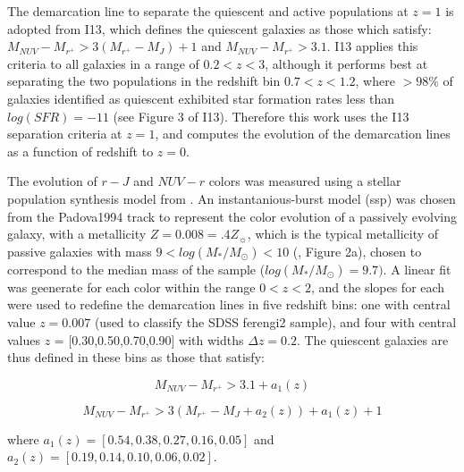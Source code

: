 \documentclass[useAMS,usenatbib]{mn2e}
\begin{document}
The demarcation line to separate the quiescent and active populations at $z=1$ is adopted from I13, which defines the quiescent galaxies as those which satisfy: $M_{NUV}-M_{r^{+}} > 3(M_{r^{+}}-M_{J})+1$ and $M_{NUV}-M_{r^{+}} > 3.1$. I13 applies this criteria to all galaxies in a range of $0.2<z<3$, although it performs best at separating the two populations in the redshift bin $0.7<z<1.2$, where $>98\%$ of galaxies identified as quiescent exhibited star formation rates less than $log(SFR) = -11$ (see Figure 3 of I13). Therefore this work uses the I13 separation criteria at $z=1$, and computes the evolution of the demarcation lines as a function of redshift to $z=0$. 

The evolution of $r-J$ and $NUV-r$ colors was measured using a stellar population synthesis model from \citet{Bruzual2003}. An instantanious-burst model (ssp) was chosen from the Padova1994 track to represent the color evolution of a passively evolving galaxy, with a metallicity $Z=0.008=.4Z_{\sun}$, which is the typical metallicity of passive galaxies with mass $9 < log(M_{*}/M_{\odot}) < 10$ (\citet{Peng2015}, Figure 2a), chosen to correspond to the median mass of the sample ($log(M_{*}/M_{\odot})=9.7)$. A linear fit was geenerate for each color within the range $0<z<2$, and the slopes for each were used to redefine the demarcation lines in five redshift bins: one with central value $z=0.007$ (used to classify the SDSS ferengi2 sample), and four with central values $z$ = [0.30,0.50,0.70,0.90] with widths $\Delta z=0.2$. The quiescent galaxies are thus defined in these bins as those that satisfy:

\begin{equation}
M_{NUV}-M_{r^{+}} > 3.1 + a_{1}(z)
\end{equation}

\begin{equation}
M_{NUV}-M_{r^{+}} > 3(M_{r^{+}}-M_{J} + a_{2}(z))+ a_{1}(z) + 1  
\end{equation}

where $a_{1}(z) = [0.54,0.38,0.27,0.16,0.05]$ and $a_{2}(z) = [0.19,0.14,0.10,0.06,0.02]$. 
\end{document}

